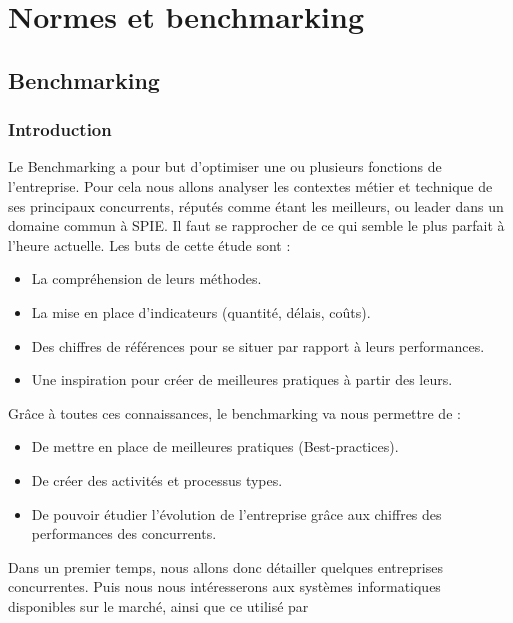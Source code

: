 \chapter{Normes et benchmarking}
\section{Benchmarking}
\subsection{Introduction}
	Le Benchmarking a pour but d'optimiser une ou plusieurs fonctions de l'entreprise. Pour cela nous allons analyser les contextes métier et technique de ses principaux concurrents, réputés comme étant les meilleurs, ou leader dans un domaine commun à SPIE. Il faut se rapprocher de ce qui semble le plus parfait à l'heure actuelle.
	Les buts de cette étude sont :
\begin{itemize}
	\item La compréhension de leurs méthodes.
	\item La mise en place d'indicateurs (quantité, délais, coûts).
	\item Des chiffres de références pour se situer par rapport à leurs performances.
	\item Une inspiration pour créer de meilleures pratiques à partir des leurs.
\end{itemize}
	Grâce à toutes ces connaissances, le benchmarking va nous permettre de :
\begin{itemize}
	\item De mettre en place de meilleures pratiques (Best-practices).
	\item De créer des activités et processus types.
	\item De pouvoir étudier l'évolution de l'entreprise grâce aux chiffres des performances des concurrents.
\end{itemize}

	Dans un premier temps, nous allons donc détailler quelques entreprises concurrentes. Puis nous nous intéresserons aux systèmes informatiques disponibles sur le marché, ainsi que ce utilisé par   
